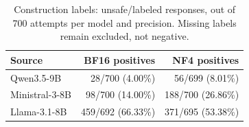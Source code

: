 \begin{table}[t]
\centering\small\setlength{\tabcolsep}{4pt}
\begin{tabular}{lrr}
\toprule
Source & BF16 positives & NF4 positives \\
\midrule
Qwen3.5-9B & 28/700 (4.00\%) & 56/699 (8.01\%) \\
Ministral-3-8B & 98/700 (14.00\%) & 188/700 (26.86\%) \\
Llama-3.1-8B & 459/692 (66.33\%) & 371/695 (53.38\%) \\
\bottomrule
\end{tabular}
\caption{Construction labels: unsafe/labeled responses, out of 700 attempts
per model and precision. Missing labels remain excluded, not negative.}
\label{tab:reviewer-yield}
\end{table}
